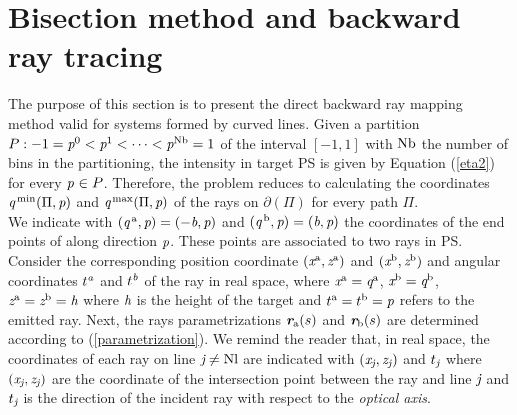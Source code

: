 \section{Bisection method and backward ray tracing}\label{sec:raymapping_explanation}
The purpose of this section is to present the direct backward ray mapping method valid for systems formed by curved lines. 
Given a partition $P: -1 = \textit{p}^0<\textit{p}^1<\cdots<\textit{p}^{\textrm{Nb}}=1$ of the interval $[-1,1]$ with $\textrm{Nb}$ the number of bins in the partitioning, the intensity in target PS is given by Equation (\ref{eta2}) for every $\textit{p}_{\textrm{} \textit{}}\in P$.
Therefore, the problem reduces to calculating the coordinates 
$\textit{q}^{\textrm{\,min}}(\Pi, \textit{p})$ and $\textit{q}^{\textrm{\,max}}(\Pi, \textit{p})$ of the rays on $\partial$$(\Pi)$ for every path $\Pi$. 
\\ \indent 
We indicate with $(\textit{q}^{\,\textrm{a}}, \textit{p})= (-\textit{b}, \textit{p})$ and $(\textit{q}^{\,\textrm{b}}, \textit{p}) = (\textit{b}, \textit{p})$ the coordinates of the end points of  along direction $\textit{p}$. These points are associated to two rays in PS. Consider the corresponding position coordinate $(\textit{x}^{\textrm{a}}, \textit{z}^{\textrm{a}})$ and $(\textit{x}^{\textrm{b}}, \textit{z}^{\textrm{b}})$ and angular coordinates $t^{\textit{a}}$ and $t^{\textit{b}}$ of the ray in real space, where $\textit{x}^{\textrm{a}} = \textit{q}^{\textrm{a}}$, $\textit{x}^{\textrm{b}} = \textit{q}^{\textrm{b}}$, $\textit{z}^{\textrm{a}} = \textit{z}^{\textrm{b}} = \textit{h}$ where $\textit{h}$ is the height of the target and $t^{\textrm{a}}= t^{\textrm{b}}=\textit{p}$ refers to the emitted ray. Next, the rays parametrizations $\textit{\textbf{r}}_{\textrm{a}}(s)$ and $\textit{\textbf{r}}_{\textrm{b}}(s)$ are determined according to (\ref{parametrization}).
We remind the reader that, in real space, the coordinates of each ray on line $\textit{j}\neq \textrm{Nl}$ are indicated with $(\textit{x}_{\textit{j}}, \textit{z}_{\textit{j}})$ and $t_{\textit{j}}$ where $(\textit{x}_{\textit{j}}, \textit{z}_{\textit{j}})$ are the coordinate of the intersection point between the ray and line $\textit{j}$ and $t_{\textit{j}}$ is the direction of the incident ray with respect to the \textit{optical axis}. 
